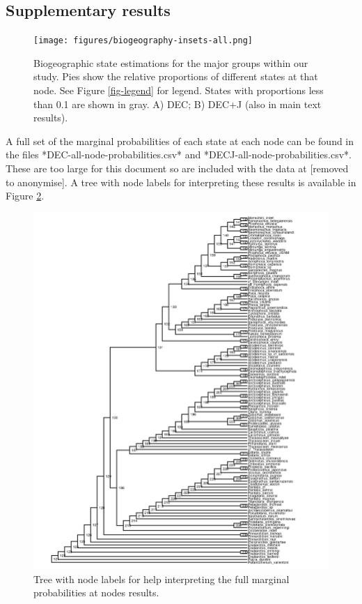 \documentclass[a4paper, 12pt]{article}
\begin{document}
\subsection{Supplementary results}

\begin{figure}[H]
 \centering
  \texttt{[image: figures/biogeography-insets-all.png]}
  \caption{Biogeographic state estimations for the major groups within our study. Pies show the relative proportions of different states at that node. See Figure \ref{fig-legend} for legend. States with proportions less than 0.1 are shown in gray. A) DEC; B) DEC+J (also in main text results).}
  \label{fig-nodes}
\end{figure} 



A full set of the marginal probabilities of each state at each node can be found in the files *DEC-all-node-probabilities.csv* and 
*DECJ-all-node-probabilities.csv*. These are too large for this document so are included with the data at [removed to anonymise]. A tree with node labels for interpreting these results is available in Figure \ref{fig-node-labels}.

\begin{figure}[H]
 \centering
  \includegraphics[width = \linewidth]{figures/node-labels-tree.png}
  \caption{Tree with node labels for help interpreting the full marginal probabilities at nodes results.}
  \label{fig-node-labels}
\end{figure}  
\end{document}
